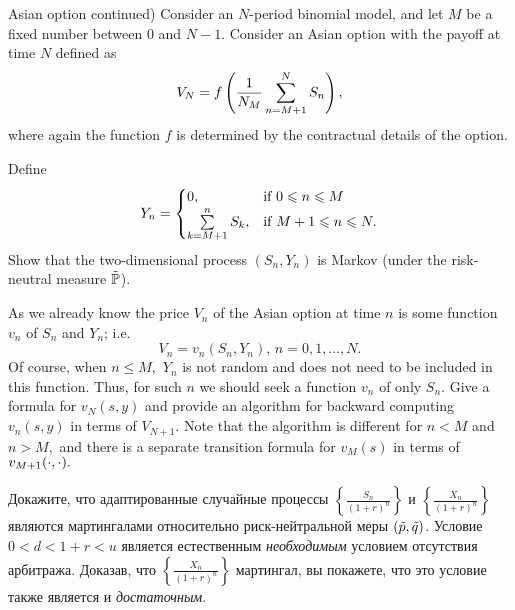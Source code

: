 \begin{problem}
 Asian option continued) Consider an $N$-period binomial model,
and let $M$ be a fixed number between $0$ and $N-1$. Consider an Asian option with the payoff
at time $N$ defined as
\[
V_N=f\left(\frac{1}{N_M}\sum\lims_{n=M+1}^{N} S_n \right),
\]
\ni where again the function $f$ is determined by the contractual details of the option.

Define
\[
Y_n=
\begin{cases}
0,&\text{if }0\le n\le M\\
\sum\lims_{k=M+1}^{n} S_k,&\text{if }M+1\le n\le N.
\end{cases}
\]
\ni Show that the two-dimensional process $(S_n,Y_n)$ is Markov
(under the risk-neutral measure $\tilde{\P}$).

As we already know the price $V_n$ of the Asian option at time $n$
is some function $v_n$ of $S_n$ and $Y_n$; i.e.
\[
V_n=v_n(S_n,Y_n),\, n=0,1,\dots,N.
\]
\ni Of course, when $n\le M,$ $Y_n$ is not random and does not need to be included
in this function. Thus, for such $n$ we should seek a function $v_n$ of only $S_n$.
\ni Give a formula for $v_N(s,y)$ and provide an algorithm for backward computing
$v_n(s,y)$ in terms of $V_{N+1}.$ Note that the algorithm is different for $n<M$
and $n>M,$ and there is a separate transition formula for $v_M(s)$ in terms of
$v_{M+1}(\cd,\cd).$

\begin{sol}

\end{sol}
\end{problem}

\begin{problem}
 Докажите, что адаптированные случайные процессы $\left\{ \frac{S_n}{(1+r)^n}\right\}$ и
  $\left\{ \frac{X_n}{(1+r)^n}\right\}$ являются мартингалами относительно риск-нейтральной
  меры $(\ti p, \ti q)$. Условие $0<d<1+r<u$ является естественным \emph{необходимым} условием
  отсутствия арбитража. Доказав, что $\left\{ \frac{X_n}{(1+r)^n}\right\}$ мартингал, вы покажете,
  что это условие также является и \emph{достаточным}.

\begin{sol}

\end{sol}
\end{problem}

